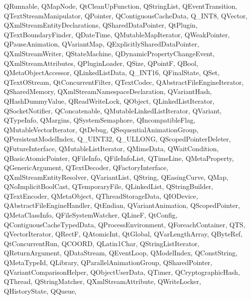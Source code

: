 {{    QRunnable,%
    QMapNode,%
    QtCleanUpFunction,%
    QStringList,%
    QEventTransition,%
    QTextStreamManipulator,%
    QPointer,%
    QContiguousCacheData,%
    Q_INT8,%
    QVector,%
    QXmlStreamEntityDeclarations,%
    QSharedDataPointer,%
    QtPlugin,%
    QTextBoundaryFinder,%
    QDateTime,%
    QMutableMapIterator,%
    QWeakPointer,%
    QPauseAnimation,%
    QVariantMap,%
    QExplicitlySharedDataPointer,%
    QXmlStreamWriter,%
    QStateMachine,%
    QDynamicPropertyChangeEvent,%
    QXmlStreamAttributes,%
    QPluginLoader,%
    QSize,%
    QPointF,%
    QBool,%
    QMetaObjectAccessor,%
    QLinkedListData,%
    Q_INT16,%
    QFinalState,%
    QSet,%
    QTextOStream,%
    QtConcurrentFilter,%
    QTextCodec,%
    QAbstractFileEngineIterator,%
    QSharedMemory,%
    QXmlStreamNamespaceDeclaration,%
    QVariantHash,%
    QHashDummyValue,%
    QReadWriteLock,%
    QObject,%
    QLinkedListIterator,%
    QSocketNotifier,%
    QConcatenable,%
    QMutableLinkedListIterator,%
    QVariant,%
    QTypeInfo,%
    QMargins,%
    QSystemSemaphore,%
    QIncompatibleFlag,%
    QMutableVectorIterator,%
    QtDebug,%
    QSequentialAnimationGroup,%
    QPersistentModelIndex,%
    Q_UINT32,%
    Q_ULLONG,%
    QScopedPointerDeleter,%
    QFutureInterface,%
    QMutableListIterator,%
    QMimeData,%
    QWaitCondition,%
    QBasicAtomicPointer,%
    QFileInfo,%
    QFileInfoList,%
    QTimeLine,%
    QMetaProperty,%
    QGenericArgument,%
    QTextDecoder,%
    QFactoryInterface,%
    QXmlStreamEntityResolver,%
    QVariantList,%
    QString,%
    QEasingCurve,%
    QMap,%
    QNoImplicitBoolCast,%
    QTemporaryFile,%
    QLinkedList,%
    QStringBuilder,%
    QTextEncoder,%
    QMetaObject,%
    QThreadStorageData,%
    QIODevice,%
    QAbstractFileEngineHandler,%
    QtEndian,%
    QVariantAnimation,%
    QScopedPointer,%
    QMetaClassInfo,%
    QFileSystemWatcher,%
    QLineF,%
    QtConfig,%
    QContiguousCacheTypedData,%
    QProcessEnvironment,%
    QForeachContainer,%
    QTS,%
    QVectorIterator,%
    QRectF,%
    QAtomicInt,%
    QtGlobal,%
    QVarLengthArray,%
    QByteRef,%
    QtConcurrentRun,%
    QCOORD,%
    QLatin1Char,%
    QStringListIterator,%
    QReturnArgument,%
    QDataStream,%
    QEventLoop,%
    QModelIndex,%
    QConstString,%
    QMetaTypeId,%
    QLibrary,%
    QParallelAnimationGroup,%
    QSharedPointer,%
    QVariantComparisonHelper,%
    QObjectUserData,%
    QTimer,%
    QCryptographicHash,%
    QThread,%
    QStringMatcher,%
    QXmlStreamAttribute,%
    QWriteLocker,%
    QHistoryState,%
    QQueue,%
}}
